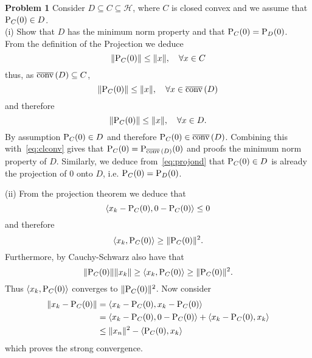 \documentclass{scrartcl}
\renewcommand{\H}{\mathcal{H}}
\newcommand{\sub}{\subseteq}
\theoremstyle{plain}
\theoremstyle{remark}
\renewcommand{\P}{\textup{P}}
\newcommand{\clconv}{\overline{\textup{conv}}\,}
\begin{document}
\textbf{Problem 1} Consider $D \sub C \sub \H$, where $C$ is closed convex and we assume that $\P_C(0) \in D$.\\
(i) Show that $D$ has the minimum norm property and that $\P_C(0) = \P_D(0)$. \\
From the definition of the Projection we deduce 
\begin{equation}
  \lVert \P_C(0) \rVert \le \lVert x \rVert, \quad \forall x \in C
\end{equation}
thus, as $\clconv(D) \sub C$,
\begin{equation}
  \label{eq:clconv}
  \lVert \P_C(0) \rVert \le \lVert x \rVert, \quad \forall x \in \clconv(D)
\end{equation}
and therefore
\begin{equation}
  \label{eq:projond}
  \lVert \P_C(0) \rVert \le \lVert x \rVert, \quad \forall x \in D.
\end{equation}
By assumption $\P_C(0) \in D$ and therefore $\P_C(0) \in \clconv(D)$.
Combining this with~\eqref{eq:clconv} gives that $\P_C(0) = \P_{\clconv(D)}(0)$ and proofs the minimum norm property of $D$.
Similarly, we deduce from~\eqref{eq:projond} that $\P_C(0) \in D$ is already the projection of $0$ onto $D$, i.e. $\P_C(0) = \P_D(0)$.

(ii)
From the projection theorem we deduce that
\begin{equation}
  \label{eq:lala}
  \left\langle x_{k} - \P_C(0), 0 - \P_C(0) \right\rangle \le 0
\end{equation}
and therefore
\begin{equation}
  \left\langle x_{k}, \P_C(0) \right\rangle \ge \lVert \P_C(0) \rVert^2.
\end{equation}
Furthermore, by Cauchy-Schwarz also have that
\begin{equation}
  \lVert \P_C(0) \rVert \lVert x_{k} \rVert \ge \left\langle x_{k}, \P_C(0) \right\rangle \ge \lVert \P_C(0) \rVert^2.
\end{equation}
Thus $\left\langle x_{k}, \P_C(0) \right\rangle$ converges to $\lVert \P_C(0) \rVert^{2}$.
Now consider
\begin{equation}
  \begin{aligned}
    \lVert x_{k} - \P_{C}(0) \rVert &= \left\langle x_{k} - \P_{C}(0), x_{k} - \P_{C}(0) \right\rangle \\
    &= \left\langle x_{k} - \P_{C}(0), 0 - \P_{C}(0) \right\rangle + \left\langle x_{k} - \P_{C}(0), x_{k} \right\rangle  \\
    &\le \lVert x_{n} \rVert^2 - \left\langle \P_{C}(0), x_{k} \right\rangle 
  \end{aligned}
\end{equation}
which proves the strong convergence.
\end{document}
